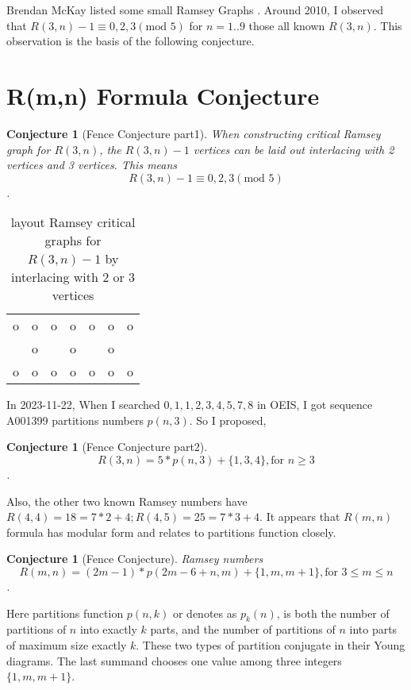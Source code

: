 \documentclass[12pt]{article}
\newtheorem{conjecture}[theorem]{Conjecture}
\begin{document}
Brendan McKay listed some small Ramsey Graphs \cite{RamseyGraphs}. 
Around 2010, I observed that $R(3,n)-1\equiv 0,2,3 (\text{mod } 5)$ for $n=1..9$ those all known $R(3,n)$.
This observation is the basis of the following conjecture.

\section{R(m,n) Formula Conjecture}\label{FormulaConjecture}

\begin{conjecture}[Fence Conjecture part1]\label{FCpart1}
  When constructing critical Ramsey graph for $R(3,n)$, 
  the $R(3,n)-1$ vertices can be laid out interlacing with 2 vertices and 3 vertices. 
  This means  \[R(3,n)-1 \equiv 0,2,3 (\text{mod }5)\] . 
\end{conjecture}

\begin{table}[]
  \caption{layout Ramsey critical graphs for $R(3,n)-1$ by interlacing with 2 or 3 vertices}
  \label{tab:interlacing23}
  \begin{tabular}{lllllll}
  o & o & o & o & o & o & o \\
    & o &   & o &   & o &   \\
  o & o & o & o & o & o & o
  \end{tabular}
  \end{table}

  
In 2023-11-22, When I searched $0,1,1,2,3,4,5,7,8$ in OEIS, I got sequence A001399 \cite{A001399} partitions numbers $p(n,3)$.
So I proposed, 

\begin{conjecture}[Fence Conjecture part2]\label{FCpart2}
  \[R(3,n)=5*p(n,3)+\{1,3,4\}, \text{for } n\geq 3\] .
\end{conjecture}

Also, the other two known Ramsey numbers have $R(4,4)=18=7*2+4; R(4,5)=25=7*3+4$. 
It appears that $R(m, n)$ formula has modular form and relates to partitions function closely.

\begin{conjecture}[Fence Conjecture]\label{FC}
Ramsey numbers
\[R(m,n)=(2m-1)*p(2m-6+n,m)+\{1,m,m+1\}, \text{for } 3\leq m\leq n\].
\end{conjecture}

Here partitions function $p(n,k)$ \cite{A008284} or denotes as $p_k(n)$, is both the number of partitions of $n$ into exactly $k$ parts, and the number of partitions of $n$ into parts of maximum size exactly $k$. 
These two types of partition conjugate in their Young diagrams. 
The last summand chooses one value among three integers $\{1,m,m+1\}$.
\end{document}
